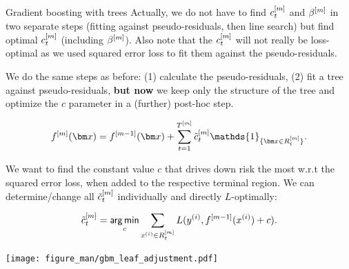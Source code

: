 \begin{vbframe}{Gradient boosting with trees}
Actually, we do not have to find $c_t^{[m]}$ and $\beta^{[m]}$ in two separate steps
(fitting against pseudo-residuals, then line search) but find optimal $c_t^{[m]}$ (including $\beta^{[m]}$).
Also note that the $c_t^{[m]}$ will not really be loss-optimal as we used squared error loss
to fit them against the pseudo-residuals.

\framebreak
\begin{footnotesize}
We do the same steps as before: (1) calculate the pseudo-residuals, (2) fit a tree against pseudo-residuals, \textbf{but now} we keep only the structure of the tree and optimize the $c$ parameter in a (further) post-hoc step.

$$
\fm(\xv) = \fmd(\xv) +  \sum_{t=1}^{\Tm} \ctmt \mathds{1}_{\{\xv \in \Rtm\}}. 
$$

We want to find the constant value $c$ that drives down risk the most w.r.t the squared error loss,
when added to the respective terminal region.
We can determine/change all $\tilde{c}_t^{[m]}$ individually and directly $L$-optimally:



$$ \tilde{c}_t^{[m]} = \mathop{\sf arg\,min}_{c} \sum_{x^{(i)} \in R_{t}^{[m]}} L(y^{(i)}, f^{[m-1]}(x^{(i)}) + c). $$

\vspace{-0.5cm}

\begin{center}

\texttt{[image: figure\_man/gbm\_leaf\_adjustment.pdf]}

\end{center}

\end{footnotesize}

\framebreak



\end{vbframe}


